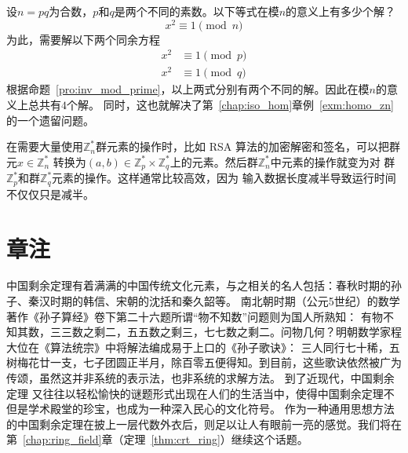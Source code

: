 \begin{example}
\label{exm:eq_sqr_cong}
	设$n = p q$为合数，$p$和$q$是两个不同的素数。以下等式在模$n$的意义上有多少个解？
	\[ x^2 \equiv 1 \pmod{n}\]
为此，需要解以下两个同余方程
	\begin{align*}
	x^2 &\equiv 1 \pmod{p} \\
	x^2 &\equiv 1 \pmod{q}
	\end{align*}
根据命题~\ref{pro:inv_mod_prime}，以上两式分别有两个不同的解。因此在模$n$的意义上总共有$4$个解。
同时，这也就解决了第~\ref{chap:iso_hom}章例~\ref{exm:homo_zn}的一个遗留问题。
\end{example}

在需要大量使用$\mathbb{Z}_n^*$群元素的操作时，比如 RSA 算法的加密解密和签名，可以把群元$x \in \mathbb{Z}_n^*$
转换为$(a, b) \in \mathbb{Z}_p^* \times \mathbb{Z}_q^*$上的元素。然后群$\mathbb{Z}_n^*$中元素的操作就变为对
群$\mathbb{Z}_p^*$和群$\mathbb{Z}_q^*$元素的操作。这样通常比较高效，因为
输入数据长度减半导致运行时间不仅仅只是减半。

\section*{章注}
中国剩余定理有着满满的中国传统文化元素，与之相关的名人包括：春秋时期的孙子、秦汉时期的韩信、宋朝的沈括和秦久韶等。
南北朝时期（公元5世纪）的数学著作《孙子算经》卷下第二十六题所谓“物不知数”问题则为国人所熟知：
有物不知其数，三三数之剩二，五五数之剩三，七七数之剩二。问物几何？明朝数学家程大位在《算法统宗》中将解法编成易于上口的《孙子歌诀》：
三人同行七十稀，五树梅花廿一支，七子团圆正半月，除百零五便得知。到目前，这些歌诀依然被广为传颂，虽然这并非系统的表示法，也非系统的求解方法。
到了近现代，中国剩余定理
又往往以轻松愉快的谜题形式出现在人们的生活当中，使得中国剩余定理不但是学术殿堂的珍宝，也成为一种深入民心的文化符号。
作为一种通用思想方法的中国剩余定理在披上一层代数外衣后，则足以让人有眼前一亮的感觉。我们将在第~\ref{chap:ring_field}章（定理~\ref{thm:crt_ring}）继续这个话题。

